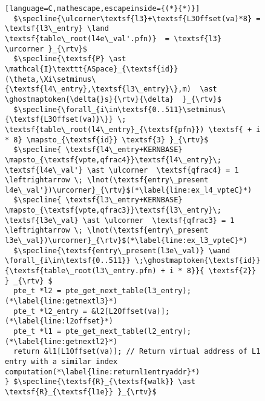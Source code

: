 \begin{figure}
\begin{lstlisting}[language=C,mathescape,escapeinside={(*}{*)}]
  $\specline{\ulcorner\textsf{l3}+\textsf{L3Offset(va)*8} = \textsf{l3\_entry} \land \textsf{table\_root(l4e\_val'.pfn)}  = \textsf{l3} \urcorner }_{\rtv}$
  $\specline{\textsf{P} \ast \mathcal{I}\texttt{ASpace}_{\textsf{id}}(\theta,\Xi\setminus\{\textsf{l4\_entry},\textsf{l3\_entry}\},m)  \ast \ghostmaptoken{\delta{}s}{\rtv}{\delta}  }_{\rtv}$
  $\specline{\forall_{i\in\textsf{0..511}\setminus\{\textsf{L3Offset(va)}\}} \; \textsf{table\_root(l4\_entry}_{\textsf{pfn}}) \textsf{ + i * 8} \mapsto_{\textsf{id}} \textsf{3} }_{\rtv}$
  $\specline{ \textsf{l4\_entry+KERNBASE} \mapsto_{\textsf{vpte,qfrac4}}\textsf{l4\_entry}\; \textsf{l4e\_val'} \ast \ulcorner  \textsf{qfrac4} = 1 \leftrightarrow \; \lnot(\textsf{entry\_present l4e\_val'})\urcorner}_{\rtv}$(*\label{line:ex_l4_vpteC}*)
  $\specline{ \textsf{l3\_entry+KERNBASE} \mapsto_{\textsf{vpte,qfrac3}}\textsf{l3\_entry}\; \textsf{l3e\_val} \ast \ulcorner  \textsf{qfrac3} = 1 \leftrightarrow \; \lnot(\textsf{entry\_present l3e\_val})\urcorner}_{\rtv}$(*\label{line:ex_l3_vpteC}*)
  $\specline{\textsf{entry\_present(l3e\_val)} \wand \forall_{i\in\textsf{0..511}} \;\ghostmaptoken{\textsf{id}}{\textsf{table\_root(l3\_entry.pfn) + i * 8}}{ \textsf{2}} } _{\rtv} $
  pte_t *l2 = pte_get_next_table(l3_entry);(*\label{line:getnextl3}*)
  pte_t *l2_entry = &l2[L2Offset(va)];(*\label{line:l2offset}*)
  pte_t *l1 = pte_get_next_table(l2_entry);(*\label{line:getnextl2}*)
  return &l1[L1Offset(va)]; // Return virtual address of L1 entry with a similar index computation(*\label{line:returnl1entryaddr}*)
} $\specline{\textsf{R}_{\textsf{walk}} \ast \textsf{R}_{\textsf{l1e}} }_{\rtv}$
\end{lstlisting}
\else
{}

\end{figure}
